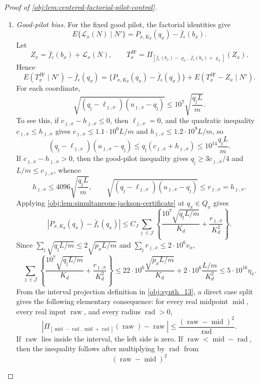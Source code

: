\begin{proof}[Proof of \cref{obj:lem:centered-factorial-pilot-control}]
\begin{enumerate}
\item \label{item:pf-good-pilot-bias}\emph{Good-pilot bias.}
For the fixed good pilot, the factorial identities give
\[
E\{\mathcal L_x(N)\mid N'\}
=
P_{x,K_d}(q_x)-\bar f_\epsilon(b_x).
\]
Let
\[
Z_x=\bar f_\epsilon(b_x)+\mathcal L_x(N),
\qquad
T_x^{\mathrm{JF}}
=
\Pi_{[\bar f_\epsilon(b_x)-\varrho_x,\,
       \bar f_\epsilon(b_x)+\varrho_x]}(Z_x).
\]
Hence
\[
E(T_x^{\mathrm{JF}}\mid N')-\bar f_\epsilon(q_x)
=
\{P_{x,K_d}(q_x)-\bar f_\epsilon(q_x)\}
+
E(T_x^{\mathrm{JF}}-Z_x\mid N').
\]
For each coordinate,
\[
\sqrt{(q_\jmath-\ell_{\jmath,x})(u_{\jmath,x}-q_\jmath)}
\le
10^7\sqrt{\frac{q_\jmath L}{m}} .
\]
To see this, if \(c_{\jmath,x}-h_{\jmath,x}\le0\), then
\(\ell_{\jmath,x}=0\), and the quadratic inequality
\(c_{\jmath,x}\le h_{\jmath,x}\) gives
\(c_{\jmath,x}\le1.1\cdot10^6L/m\) and
\(h_{\jmath,x}\le1.2\cdot10^9L/m\), so
\[
(q_\jmath-\ell_{\jmath,x})(u_{\jmath,x}-q_\jmath)
\le q_\jmath(c_{\jmath,x}+h_{\jmath,x})
\le 10^{14}\frac{q_\jmath L}{m}.
\]
If \(c_{\jmath,x}-h_{\jmath,x}>0\), then the good-pilot inequality gives
\(q_\jmath\ge3c_{\jmath,x}/4\) and \(L/m\le c_{\jmath,x}\), whence
\[
h_{\jmath,x}\le4096\sqrt{\frac{q_\jmath L}{m}},
\qquad
\sqrt{(q_\jmath-\ell_{\jmath,x})(u_{\jmath,x}-q_\jmath)}
\le r_{\jmath,x}=h_{\jmath,x}.
\]
Applying \cref{obj:lem:simultaneous-jackson-certificate} at \(q_x\in Q_x\) gives
\[
|P_{x,K_d}(q_x)-\bar f_\epsilon(q_x)|
\le
C_J
\sum_{\jmath\in\mathcal J}
\left\{
\frac{10^7\sqrt{q_\jmath L/m}}{K_d}
+
\frac{r_{\jmath,x}}{K_d^2}
\right\}.
\]
Since \(\sum_{\jmath}\sqrt{q_\jmath L/m}\le2\sqrt{p_xL/m}\) and
\(\sum_{\jmath}r_{\jmath,x}\le2\cdot10^6v_x\),
\[
\sum_{\jmath\in\mathcal J}
\left\{
\frac{10^7\sqrt{q_\jmath L/m}}{K_d}
+
\frac{r_{\jmath,x}}{K_d^2}
\right\}
\le
22\cdot10^6\frac{\sqrt{p_xL/m}}{K_d}
+
2\cdot10^6\frac{L/m}{K_d^2}
\le
5\cdot10^{16}\eta_x .
\]
From the interval projection definition in \cref{obj:synth_13}, a direct case split gives the following elementary consequence: for every real midpoint \(\operatorname{mid}\), every real input \(\operatorname{raw}\), and every radius \(\operatorname{rad}>0\),
\[
\left|
\Pi_{[\operatorname{mid}-\operatorname{rad},\operatorname{mid}+\operatorname{rad}]}
(\operatorname{raw})-\operatorname{raw}
\right|
\le
\frac{(\operatorname{raw}-\operatorname{mid})^2}{\operatorname{rad}}.
\]
If \(\operatorname{raw}\) lies inside the interval, the left side is zero.  If
\(\operatorname{raw}<\operatorname{mid}-\operatorname{rad}\), then the inequality follows after multiplying by \(\operatorname{rad}\) from
\[
(\operatorname{raw}-\operatorname{mid})^2
\]
\end{enumerate}
\end{proof}
